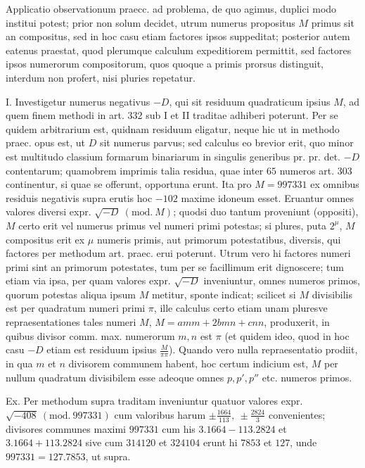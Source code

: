 Applicatio observationum praecc. ad problema, de quo agimus, duplici modo institui potest; prior non solum decidet, utrum numerus propositus \(M\) primus sit an compositus, sed in hoc casu etiam factores ipsos suppeditat; posterior autem eatenus praestat, quod plerumque calculum expeditiorem permittit, sed factores ipsos numerorum compositorum, quos quoque a primis prorsus distinguit, interdum non profert, nisi pluries repetatur.

I. Investigetur numerus negativus \(-D\), qui sit residuum quadraticum ipsius \(M\), ad quem finem methodi in art. 332 sub I et II traditae adhiberi poterunt. Per se quidem arbitrarium est, quidnam residuum eligatur, neque hic ut in methodo praec. opus est, ut \(D\) sit numerus parvus; sed calculus eo brevior erit, quo minor est multitudo classium formarum binariarum in singulis generibus pr. pr. det. \(-D\) contentarum; quamobrem imprimis talia residua, quae inter \(65\) numeros art. 303 continentur, si quae se offerunt, opportuna erunt. Ita pro \(M=997331\) ex omnibus residuis negativis supra erutis hoc \(-102\) maxime
idoneum esset. Eruantur omnes valores diversi expr. \(\surd{-D}\ (\mathrm{mod.}\ M)\); quodsi duo tantum proveniunt (oppositi), \(M\) certo erit vel numerus primus vel numeri primi potestas; si plures, puta \(2^\mu\), \(M\) compositus erit ex \(\mu\) numeris primis, aut primorum potestatibus, diversis, qui factores per methodum art. praec. erui poterunt. Utrum vero hi factores numeri primi sint an primorum potestates, tum per se facillimum erit dignoscere; tum etiam via ipsa, per quam valores expr. \(\surd{-D}\) inveniuntur, omnes numeros primos, quorum potestas aliqua ipsum \(M\) metitur, sponte indicat; scilicet si \(M\) divisibilis est per quadratum numeri primi \(\pi\), ille calculus certo etiam unam pluresve repraesentationes tales numeri \(M\), \(M=amm+2bmn+cnn\), produxerit, in quibus divisor comm. max. numerorum \(m,\allowbreak n\) est \(\pi\) (et quidem ideo, quod in hoc casu \(-D\) etiam est residuum ipsius \(\frac{M}{\pi\pi}\)). Quando vero nulla repraesentatio prodiit, in qua \(m\) et \(n\) divisorem communem habent, hoc certum indicium est, \(M\) per nullum quadratum divisibilem esse adeoque omnes \(p,\allowbreak p',\allowbreak p''\) etc. numeros primos.

Ex. Per methodum supra traditam inveniuntur quatuor valores expr. \(\surd{-408}\ (\mathrm{mod.}\ 997331)\) cum valoribus harum \(\pm\frac{1664}{113},\allowbreak \ \pm\frac{2824}{3}\) convenientes; divisores communes maximi \(997331\) cum his \(3.1664-113.2824\) et \(3.1664+113.2824\) sive cum \(314120\) et \(324104\) erunt hi \(7853\) et \(127\), unde \(997331=127.7853\), ut supra.

